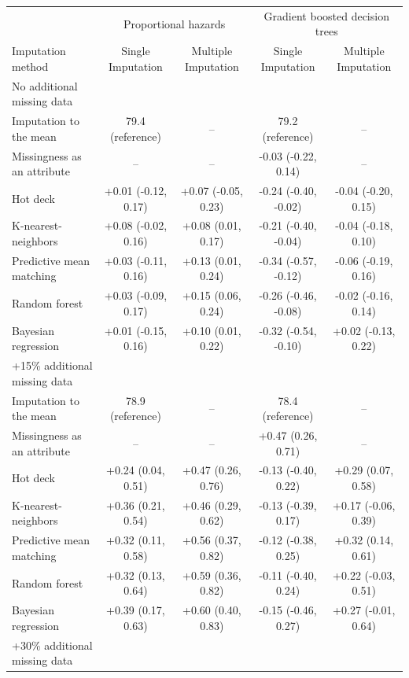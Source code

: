 \documentclass{article}
\begin{document}
\begin{table}
\begin{tabular}{lcccc}
\toprule
& \multicolumn{2}{c}{Proportional hazards} & \multicolumn{2}{c}{Gradient boosted decision trees} \\ 
 \cmidrule(lr){2-3}\cmidrule(lr){4-5}
Imputation method & Single Imputation & Multiple Imputation & Single Imputation & Multiple Imputation \\ 
\midrule
\multicolumn{1}{l}{No additional missing data} \\ 
\midrule
Imputation to the mean & 79.4 (reference) & -- & 79.2 (reference) & -- \\ 
Missingness as an attribute & -- & -- & -0.03 (-0.22, 0.14) & -- \\ 
Hot deck & +0.01 (-0.12, 0.17) & +0.07 (-0.05, 0.23) & -0.24 (-0.40, -0.02) & -0.04 (-0.20, 0.15) \\ 
K-nearest-neighbors & +0.08 (-0.02, 0.16) & +0.08 (0.01, 0.17) & -0.21 (-0.40, -0.04) & -0.04 (-0.18, 0.10) \\ 
Predictive mean matching & +0.03 (-0.11, 0.16) & +0.13 (0.01, 0.24) & -0.34 (-0.57, -0.12) & -0.06 (-0.19, 0.16) \\ 
Random forest & +0.03 (-0.09, 0.17) & +0.15 (0.06, 0.24) & -0.26 (-0.46, -0.08) & -0.02 (-0.16, 0.14) \\ 
Bayesian regression & +0.01 (-0.15, 0.16) & +0.10 (0.01, 0.22) & -0.32 (-0.54, -0.10) & +0.02 (-0.13, 0.22) \\ 
\midrule
\multicolumn{1}{l}{+15\% additional missing data} \\ 
\midrule
Imputation to the mean & 78.9 (reference) & -- & 78.4 (reference) & -- \\ 
Missingness as an attribute & -- & -- & +0.47 (0.26, 0.71) & -- \\ 
Hot deck & +0.24 (0.04, 0.51) & +0.47 (0.26, 0.76) & -0.13 (-0.40, 0.22) & +0.29 (0.07, 0.58) \\ 
K-nearest-neighbors & +0.36 (0.21, 0.54) & +0.46 (0.29, 0.62) & -0.13 (-0.39, 0.17) & +0.17 (-0.06, 0.39) \\ 
Predictive mean matching & +0.32 (0.11, 0.58) & +0.56 (0.37, 0.82) & -0.12 (-0.38, 0.25) & +0.32 (0.14, 0.61) \\ 
Random forest & +0.32 (0.13, 0.64) & +0.59 (0.36, 0.82) & -0.11 (-0.40, 0.24) & +0.22 (-0.03, 0.51) \\ 
Bayesian regression & +0.39 (0.17, 0.63) & +0.60 (0.40, 0.83) & -0.15 (-0.46, 0.27) & +0.27 (-0.01, 0.64) \\ 
\midrule
\multicolumn{1}{l}{+30\% additional missing data} \\ 

\end{tabular}
\end{table}
\end{document}
